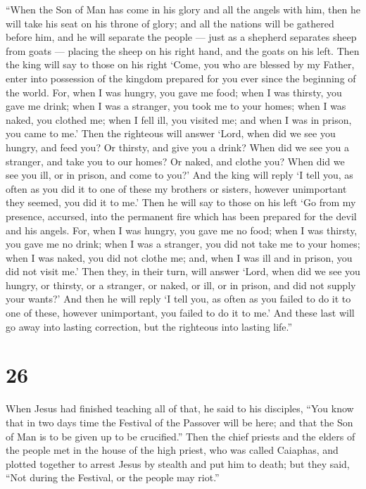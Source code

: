  ``When the Son of Man has come in his glory and all the
angels with him, then he will take his seat on his throne of glory;
 and all the nations will be gathered before him, and he
will separate the people --- just as a shepherd separates sheep from
goats ---  placing the sheep on his right hand, and the
goats on his left.  Then the king will say to those on his
right `Come, you who are blessed by my Father, enter into possession of
the kingdom prepared for you ever since the beginning of the world.
 For, when I was hungry, you gave me food; when I was
thirsty, you gave me drink; when I was a stranger, you took me to your
homes;  when I was naked, you clothed me; when I fell ill,
you visited me; and when I was in prison, you came to me.' 
Then the righteous will answer `Lord, when did we see you hungry, and
feed you? Or thirsty, and give you a drink?  When did we
see you a stranger, and take you to our homes? Or naked, and clothe you?
 When did we see you ill, or in prison, and come to you?'
 And the king will reply `I tell you, as often as you did
it to one of these my brothers or sisters, however unimportant they
seemed, you did it to me.'  Then he will say to those on
his left `Go from my presence, accursed, into the permanent fire which
has been prepared for the devil and his angels.  For, when
I was hungry, you gave me no food; when I was thirsty, you gave me no
drink;  when I was a stranger, you did not take me to your
homes; when I was naked, you did not clothe me; and, when I was ill and
in prison, you did not visit me.'  Then they, in their
turn, will answer `Lord, when did we see you hungry, or thirsty, or a
stranger, or naked, or ill, or in prison, and did not supply your
wants?'  And then he will reply `I tell you, as often as
you failed to do it to one of these, however unimportant, you failed to
do it to me.'  And these last will go away into lasting
correction, but the righteous into lasting life.''

\hypertarget{section-25}{%
\section{26}\label{section-25}}

 When Jesus had finished teaching all of that, he said to
his disciples,  ``You know that in two days time the
Festival of the Passover will be here; and that the Son of Man is to be
given up to be crucified.''  Then the chief priests and the
elders of the people met in the house of the high priest, who was called
Caiaphas,  and plotted together to arrest Jesus by stealth
and put him to death;  but they said, ``Not during the
Festival, or the people may riot.''

